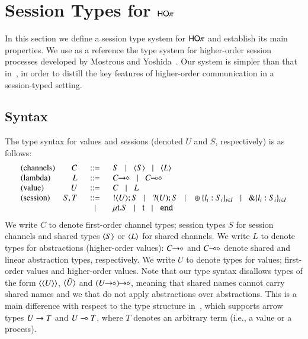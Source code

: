 \section{Session Types for $\mathsf{HO}\pi$}
\label{s:types}

In this section we define a session type system for
$\mathsf{HO}\pi$ and establish its main properties. We use as
a reference the type system for higher-order session processes 
developed by Mostrous and Yoshida~\cite{tlca07}.
Our system is simpler than that in~\cite{tlca07}, in order to distill the key
features of higher-order communication in a session-typed setting.


\subsection{Syntax}
The type syntax for values and sessions
(denoted $U$ and $S$, respectively) is as follows:
%
\[
\begin{array}{lrcl}
	\textrm{(channels)} & C & \bnfis &	S \bnfbar \chtype{S} \bnfbar \chtype{L}
	\\

	\textrm{(lambda)} & L & \bnfis &	\shot{C} \bnfbar \lhot{C}
	\\

	\textrm{(value)} & U & \bnfis &	C \bnfbar L 
	\\

	\textrm{(session)} & S,T & \bnfis & 	\btout{U} S \bnfbar \btinp{U} S
						\bnfbar \btsel{l_i:S_i}_{i \in I} \bnfbar \btbra{l_i:S_i}_{i \in I}\\
				&&\bnfbar&	\trec{t}{S} \bnfbar \vart{t}  \bnfbar \tinact
\end{array}
\]
%
\noi We write $C$ to denote first-order channel types; session types $S$
for session channels and shared types $\langle S \rangle$ or $\langle L \rangle$ 
for shared channels.
We write $L$ to denote types for abstractions (higher-order values): %
$C\!\! \rightarrow\!\! \diamond$ and $C\!\! \multimap\!\! \diamond$ denote
shared and linear abstraction types, respectively.
We write $U$ to denote types for values; first-order values and 
higher-order values.
Note that our type syntax disallows types of
the form $\langle \langle U \rangle \rangle$, $\langle \tilde{U} \rangle$
and $\shot{(\shot{U})}$,
meaning that shared names cannot carry shared names and
we that do not apply abstractions over abstractions.
This is a main difference with respect to the type structure 
in~\cite{tlca07}, which  supports arrow types 
$U \rightarrow T$ and 
$U \multimap T$, where $T$ denotes an arbitrary term 
(i.e., a value or a process).

